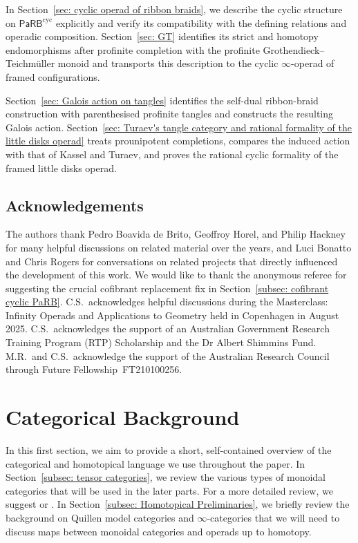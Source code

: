 \documentclass{amsart}
\newcommand{\PaRB}{\mathsf{PaRB}}
\theoremstyle{definition}
\numberwithin{equation}{section}
\begin{document}
In Section~\ref{sec: cyclic operad of ribbon braids}, we describe the
cyclic structure on $\PaRB^{\mathrm{cyc}}$ explicitly and verify its
compatibility with the defining relations and operadic composition.
Section~\ref{sec: GT} identifies its strict and homotopy
endomorphisms after profinite completion with the profinite
Grothendieck--Teichmüller monoid and transports this description to
the cyclic $\infty$-operad of framed configurations.

Section~\ref{sec: Galois action on tangles} identifies the self-dual
ribbon-braid construction with parenthesised profinite tangles and
constructs the resulting Galois action.
Section~\ref{sec: Turaev's tangle category and rational formality
of the little disks operad} treats prounipotent completions, compares
the induced action with that of Kassel and Turaev, and proves the
rational cyclic formality of the framed little disks operad.

\subsection*{Acknowledgements}

The authors thank Pedro Boavida de Brito, Geoffroy Horel, and Philip
Hackney for many helpful discussions on related material over the
years, and Luci Bonatto and Chris Rogers for conversations on related
projects that directly influenced the development of this work. We would like to thank the anonymous referee for suggesting the crucial cofibrant replacement fix in Section~\ref{subsec: cofibrant cyclic PaRB}.
C.S.\ acknowledges helpful discussions during the Masterclass:
Infinity Operads and Applications to Geometry held in Copenhagen in
August 2025. C.S.\ acknowledges the support of an
Australian Government Research Training Program (RTP) Scholarship
and the Dr Albert Shimmins Fund.  M.R.\ and C.S.\ acknowledge the support of the
Australian Research Council through Future
Fellowship~FT210100256. 
\tableofcontents
\section{Categorical Background}\label{sec: categorical background}
In this first section, we aim to provide a short, self-contained overview of the categorical and homotopical language we use throughout the paper.  In Section~\ref{subsec: tensor categories}, we review the various types of monoidal categories that will be used in the later parts. For a more detailed review, we suggest \cite{kassel_quantum_1995} or \cite{Etingof2015TensorCategories}. In Section~\ref{subsec: Homotopical Preliminaries}, we briefly review the background on Quillen model categories and $\infty$-categories that we will need to discuss maps between monoidal categories and operads up to homotopy. 
\end{document}
